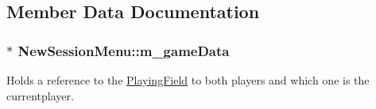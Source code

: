 \subsection{Member Data Documentation}
\hypertarget{classNewSessionMenu_a1e5fc5bfe12c63b0f99df1dc3ffec0ba}{
\subsubsection[{m\-\_\-game\-Data}]{$\ast$ New\-Session\-Menu\-::m\-\_\-game\-Data}}\label{classNewSessionMenu_a1e5fc5bfe12c63b0f99df1dc3ffec0ba}


Holds a reference to the \hyperlink{classPlayingField}{Playing\-Field} to both players and which one is the currentplayer. 

